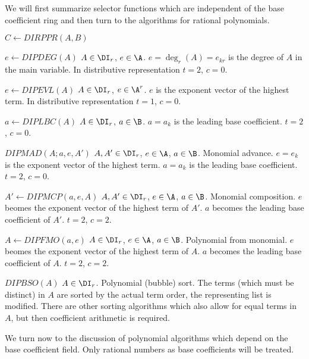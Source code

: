 We will first summarize selector %
functions which are independent of the base coefficient ring
and then turn to the algorithms for rational polynomials.

\begin{deflist}{$C \gets DIRPPR(A,B)$}
\item[$e \gets DIPDEG(A)$] $A \in \DI_r$, $e \in \A$. 
     $e = \deg_r (A) = e_{kr}$ is the degree of $A$ in the
     main variable. 
     In distributive representation $t = 2$, $c = 0$. 
\item[$e \gets DIPEVL(A)$] $A \in \DI_r$, $e \in \A^r$. 
     $e$ is the exponent vector of the highest term. 
     In distributive representation $t = 1$, $c = 0$. 
\item[$a \gets DIPLBC(A)$] $A \in \DI_r$, $a \in \B$. 
     $a = a_k$ is the leading base coefficient.
     $t = 2$, $c = 0$. 
\item[$DIPMAD(A;a,e,A')$] $A, A' \in \DI_r$, $e \in \A$, 
     $a \in \B$. Monomial advance.
     $e = e_k$ is the exponent vector of the highest term. 
     $a = a_k$ is the leading base coefficient.
     $t = 2$, $c = 0$. 
\item[$A' \gets DIPMCP(a,e,A)$] $A, A' \in \DI_r$, $e \in \A$, 
     $a \in \B$. Monomial composition.
     $e$ beomes the exponent vector of the highest term of $A'$. 
     $a$ becomes the leading base coefficient of $A'$.
     $t = 2$, $c = 2$. 
\item[$A \gets DIPFMO(a,e)$] $A \in \DI_r$, $e \in \A$, 
     $a \in \B$. Polynomial from monomial. 
     $e$ beomes the exponent vector of the highest term of $A$. 
     $a$ becomes the leading base coefficient of $A$.
     $t = 2$, $c = 2$. 
\item[$DIPBSO(A)$] $A \in \DI_r$. 
     Polynomial (bubble) sort. 
     The terms (which must be distinct)
     in $A$ are sorted by the actual term order, 
     the representing list is modified.
     There are other sorting algorithms which also allow 
     for equal terms in $A$, but then coefficient arithmetic 
     is required. 
\end{deflist}

We turn now to the discussion of  
polynomial algorithms which depend on the 
base coefficient field. 
Only rational numbers as base coefficients will be treated. 

